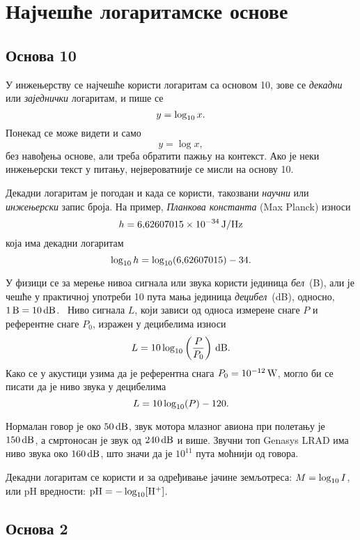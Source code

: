 \section{Најчешће логаритамске основе}

\subsection{Основа 10}

У инжењерству се најчешће користи логаритам са основом 10,
зове се {\sl декадни\/} или {\sl заједнички\/} логаритам, и пише се
$$
y=\log_{10} x.
$$
Понекад се може видети и само
$$
y=\log x,
$$
без навођења основе, али треба обратити пажњу на контекст.
Ако је неки инжењерски текст у питању, нејвероватније се мисли на основу 10.

Декадни логаритам је погодан и када се користи, такозвани
{\sl научни\/} или {\sl инжењерски\/} запис броја.
На пример, {\sl Планкова константа\/} (Max Planck) износи
$$
h=6\.62607015\puta 10^{-34}\um{J/Hz}
$$
која има декадни логаритам
$$
\logten h=\logten(6\.62607015) - 34.
$$

У физици се за мерење нивоа сигнала или звука користи јединица {\sl бел\/}~(B), али је чешће
у практичној употреби 10 пута мања јединица {\sl децибел\/}~(dB), односно, $1\,\hbox{\rm B}=10\,\hbox{\rm dB}$. \
Ниво сигнала $L$, који зависи
од односа измерене снаге $P$ и референтне снаге $P_0$, изражен у децибелима износи
$$
L=10\log_{10}\left(\frac{P}{P_0}\right)\,\hbox{\rm dB}.
$$
Како се у акустици узима да је референтна снага $P_0=10^{-12}\,\hbox{\rm W}$, могло би се писати
да је ниво звука у децибелима
$$
L=10\log_{10}(P)-120.
$$

Нормалан говор је око $50\,\hbox{\rm dB}$,
звук мотора млазног авиона при полетању је $150\,\hbox{\rm dB}$, 
а смртоносан је звук од $240\,\hbox{\rm dB}$ и више.
Звучни топ {\sf Genasys LRAD} има ниво звука око $160\,\hbox{\rm dB}$,
што значи да је $10^{11}$ пута моћнији од говора.

Декадни логаритам се користи и за одређивање јачине земљотреса: $M=\log_{10} I$, или 
pH вредности: ${\rm pH}=-\log_{10}[{\rm H}^+]$.

\subsection{Основа 2}

